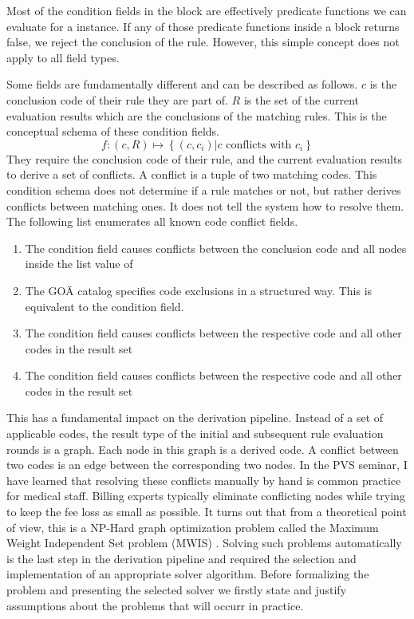 Most of the condition fields in the  block are effectively predicate functions we can evaluate for a \REI instance.
If any of those predicate functions inside a  block returns false, we reject the conclusion of the rule.
However, this simple concept does not apply to all field types.

Some fields are fundamentally different and can be described as follows.
$c$ is the conclusion code of their rule they are part of.
$R$ is the set of the current evaluation results which are the conclusions of the matching rules.
This is the conceptual schema of these condition fields.
\[
    f: \left( c, R \right) \mapsto \left\{ \left( c, c_i \right) \lvert c \text{ conflicts with } c_i \right\}
\]
They require the conclusion code of their rule, and the current evaluation results to derive a set of conflicts.
A conflict is a tuple of two matching codes.
This condition schema does not determine if a rule matches or not, but rather derives conflicts between matching ones.
It does not tell the system how to resolve them.
The following list enumerates all known code conflict fields.
\begin{enumerate}
    \item The condition field  causes conflicts between the conclusion code and all nodes inside the list value of 
    \item The GOÄ catalog specifies code exclusions in a structured way.
    This is equivalent to the  condition field.
    \item The condition field  causes conflicts between the respective code and all other codes in the result set
    \item The condition field  causes conflicts between the respective code and all other codes in the result set
\end{enumerate}

This has a fundamental impact on the derivation pipeline.
Instead of a set of applicable codes, the result type of the initial and subsequent rule evaluation rounds is a graph.
Each node in this graph is a derived code.
A conflict between two codes is an edge between the corresponding two nodes.
In the PVS seminar, I have learned that resolving these conflicts manually by hand is common practice for medical staff.
Billing experts typically eliminate conflicting nodes while trying to keep the fee loss as small as possible.
It turns out that from a theoretical point of view, this is a NP-Hard graph optimization problem called the Maximum Weight Independent Set problem
(MWIS) \cite{SAKAI2003313}.
Solving such problems automatically is the last step in the derivation pipeline
and required the selection and implementation of an appropriate solver algorithm.
Before formalizing the problem and presenting the selected solver we firstly state
and justify assumptions about the problems that will occurr in practice.

